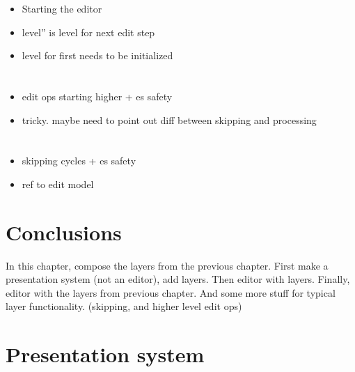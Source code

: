\begin{itemize}
\item Starting the editor
\item level'' is level for next edit step
\item level for first needs to be initialized
\end{itemize}



%																
%																
%																
\section{}
\begin{itemize}
\item edit ops starting higher + es safety
\item tricky. maybe need to point out diff between skipping and processing
\end{itemize}

\section{}
\begin{itemize}
\item skipping cycles + es safety
\item ref to edit model
\end{itemize}

\section{Conclusions}














In this chapter, compose the layers from the previous chapter. First make a presentation system (not an editor), add layers. Then editor with layers. Finally, editor with the layers from previous chapter. And some more stuff for typical layer functionality. (skipping, and higher level edit ops)




%																
%																
%																
\section{Presentation system}

